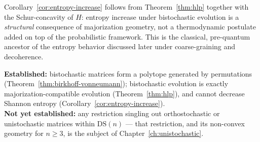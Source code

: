 \begin{remark}
Corollary~\ref{cor:entropy-increase} follows from Theorem~\ref{thm:hlp} together
with the Schur-concavity of $H$: entropy increase under bistochastic evolution
is a \emph{structural} consequence of majorization geometry, not a
thermodynamic postulate added on top of the probabilistic framework. This is
the classical, pre-quantum ancestor of the entropy behavior discussed later
under coarse-graining and decoherence.
\end{remark}

\begin{ledgerentry}
\textbf{Established:} bistochastic matrices form a polytope generated by
permutations (Theorem~\ref{thm:birkhoff-vonneumann}); bistochastic evolution is
exactly majorization-compatible evolution (Theorem~\ref{thm:hlp}), and cannot
decrease Shannon entropy (Corollary~\ref{cor:entropy-increase}).\\
\textbf{Not yet established:} any restriction singling out orthostochastic or
unistochastic matrices within $\mathrm{DS}(n)$ — that restriction, and its
non-convex geometry for $n \ge 3$, is the subject of
Chapter~\ref{ch:unistochastic}.
\end{ledgerentry}
